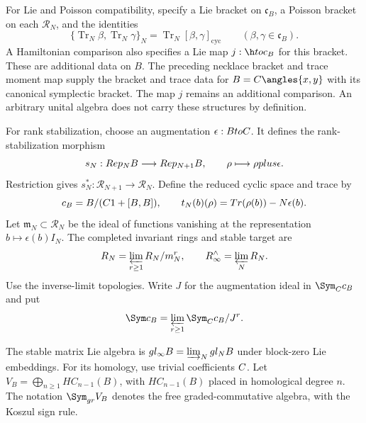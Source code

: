 For Lie and Poisson compatibility, specify a Lie bracket on $\mathfrak c_B$,
a Poisson bracket on each $\mathcal R_N$, and the identities
\begin{equation}\label{eq:vol2-trace-bracket-datum}
 \{\operatorname{Tr}_N\beta,\operatorname{Tr}_N\gamma\}_N
 =\operatorname{Tr}_N[\beta,\gamma]_{\mathrm{cyc}}
 \qquad(\beta,\gamma\in\mathfrak c_B).
\end{equation}
A Hamiltonian comparison also specifies a Lie map
$j:\h\to\mathfrak c_B$ for this bracket.
These are additional data on $B$.
The preceding necklace bracket and trace moment map supply the bracket
and trace data for $B=\C\angles{x,y}$ with its canonical symplectic bracket.
The map $j$ remains an additional comparison.
An arbitrary unital algebra does not carry these structures by definition.

For rank stabilization, choose an augmentation $\epsilon:B\to\C$.
It defines the rank-stabilization morphism
\[
 s_N:\Rep_NB\longrightarrow\Rep_{N+1}B,
 \qquad \rho\longmapsto\rho\oplus\epsilon.
\]
Restriction gives $s_N^*:\mathcal R_{N+1}\to\mathcal R_N$.
Define the reduced cyclic space and trace by
\[
 \overline{\mathfrak c}_B=B/(\C1+[B,B]),
 \qquad
 t_N(\overline b)(\rho)
 =\operatorname{Tr}(\rho(b))-N\epsilon(b).
\]
Let $\mathfrak m_N\subset\mathcal R_N$ be the ideal of functions
vanishing at the representation $b\mapsto\epsilon(b)I_N$.
The completed invariant rings and stable target are
\[
 \widehat{\mathcal R}_N
 =\varprojlim_{r\ge1}\mathcal R_N/\mathfrak m_N^r,
 \qquad
 \mathcal R_\infty^{\wedge}
 =\varprojlim_N\widehat{\mathcal R}_N.
\]
Use the inverse-limit topologies.
Write $J$ for the augmentation ideal in $\Sym_\C\overline{\mathfrak c}_B$
and put
\[
 \widehat\Sym\overline{\mathfrak c}_B
 =\varprojlim_{r\ge1}
   \Sym_\C\overline{\mathfrak c}_B/J^r.
\]

The stable matrix Lie algebra is
$\mathfrak{gl}_\infty B=\varinjlim_N\mathfrak{gl}_N B$
under block-zero Lie embeddings.
For its homology, use trivial coefficients $\C$.
Let $V_B=\bigoplus_{n\ge1}HC_{n-1}(B)$, with $HC_{n-1}(B)$ placed
in homological degree $n$.
The notation $\Sym_{\mathrm{gr}}V_B$ denotes the free graded-commutative
algebra, with the Koszul sign rule.

